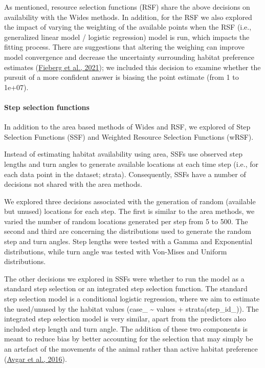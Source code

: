 \documentclass[10pt,a4paper]{article}
\begin{document}
As mentioned, resource selection functions (RSF) share the above decisions on availability with the Wides methods.
In addition, for the RSF we also explored the impact of varying the weighting of the available points when the RSF (i.e., generalized linear model / logistic regression) model is run, which impacts the fitting process.
There are suggestions that altering the weighing can improve model convergence and decrease the uncertainty surrounding habitat preference estimates (\protect\hyperlink{ref-fieberg_how_2021}{Fieberg et al., 2021}); we included this decision to examine whether the pursuit of a more confident answer is biasing the point estimate (from 1 to 1e+07).

\hypertarget{step-selection-functions}{%
\paragraph{Step selection functions}\label{step-selection-functions}}

In addition to the area based methods of Wides and RSF, we explored of Step Selection Functions (SSF) and Weighted Resource Selection Functions (wRSF).

Instead of estimating habitat availability using area, SSFs use observed step lengths and turn angles to generate available locations at each time step (i.e., for each data point in the dataset; strata).
Consequently, SSFs have a number of decisions not shared with the area methods.

We explored three decisions associated with the generation of random (available but unused) locations for each step.
The first is similar to the area methods, we varied the number of random locations generated per step from 5 to 500.
The second and third are concerning the distributions used to generate the random step and turn angles.
Step lengths were tested with a Gamma and Exponential distributions, while turn angle was tested with Von-Mises and Uniform distributions.

The other decisions we explored in SSFs were whether to run the model as a standard step selection or an integrated step selection function.
The standard step selection model is a conditional logistic regression, where we aim to estimate the used/unused by the habitat values (case\_ \textasciitilde{} values + strata(step\_id\_)).
The integrated step selection model is very similar, apart from the predictors also included step length and turn angle.
The addition of these two components is meant to reduce bias by better accounting for the selection that may simply be an artefact of the movements of the animal rather than active habitat preference (\protect\hyperlink{ref-avgar_integrated_2016}{Avgar et al., 2016}).
\end{document}
